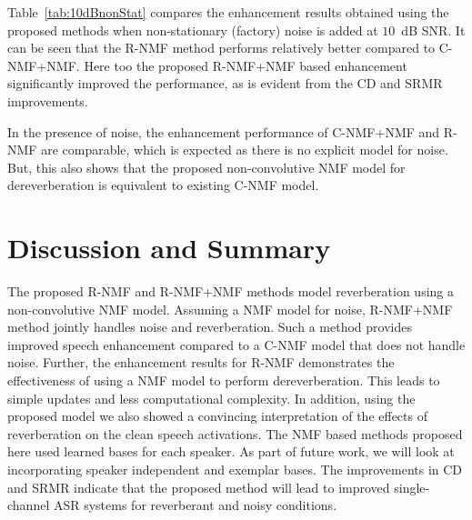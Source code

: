 Table~\ref{tab:10dBnonStat} compares the enhancement results obtained using the proposed methods when non-stationary (factory) noise is added at $10$~dB SNR. It can be seen that the R-NMF method performs relatively better compared to C-NMF+NMF. Here too the proposed R-NMF+NMF based enhancement significantly improved the performance, as is evident from the CD and SRMR improvements.

In the presence of noise, the enhancement performance of C-NMF+NMF and R-NMF are comparable, which is expected as there is no explicit model for noise. But, this also shows that the proposed non-convolutive NMF model for dereverberation is equivalent to existing C-NMF model. 
\section{Discussion and Summary}
The proposed R-NMF and R-NMF+NMF methods model reverberation using a non-convolutive NMF model. Assuming a NMF model for noise, R-NMF+NMF method jointly handles noise and reverberation. Such a method provides improved speech enhancement compared to a C-NMF model that does not handle noise. Further, the enhancement results for R-NMF	demonstrates the effectiveness of using a NMF model to perform dereverberation. 
This leads to simple updates and less computational complexity. 
In addition, using the proposed model we also showed a convincing interpretation of the effects of reverberation on the clean speech activations.  
The NMF based methods proposed here used learned bases for each speaker. As part of future work, we will look at incorporating speaker independent and exemplar bases. The improvements in CD and SRMR indicate that the proposed method will lead to improved single-channel ASR systems for reverberant and noisy conditions.

\fi